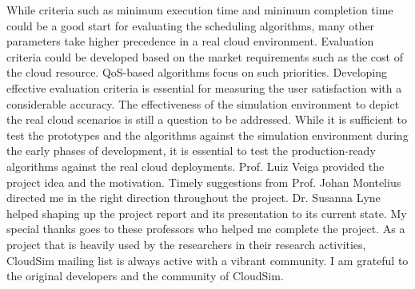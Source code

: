 \documentclass[times, 10pt,twocolumn]{article}
\begin{document}
While criteria such as minimum execution time and minimum completion time could be a good start for evaluating the scheduling algorithms, many other parameters take higher precedence in a real cloud environment. Evaluation criteria could be developed based on the market requirements such as the cost of the cloud resource. QoS-based algorithms focus on such priorities. Developing effective evaluation criteria is essential for measuring the user satisfaction with a considerable accuracy. The effectiveness of the simulation environment to depict the real cloud scenarios is still a question to be addressed. While it is sufficient to test the prototypes and the algorithms against the simulation environment during the early phases of development, it is essential to test the production-ready algorithms against the real cloud deployments.
Prof. Luiz Veiga provided the project idea and the motivation. Timely suggestions from Prof. Johan Montelius directed me in the right direction throughout the project. Dr. Susanna Lyne helped shaping up the project report and its presentation to its current state. My special thanks goes to these professors who helped me complete the project. As a project that is heavily used by the researchers in their research activities, CloudSim mailing list is always active with a vibrant community. I am grateful to the original developers and the community of CloudSim.
\end{document}
